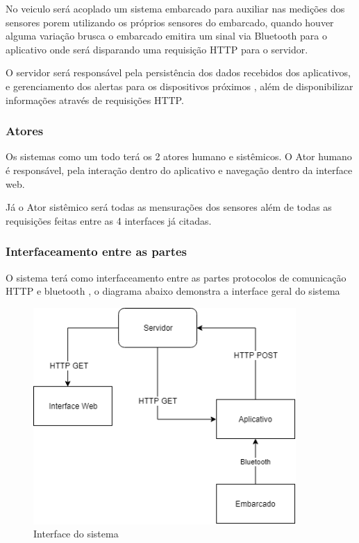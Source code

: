 No veiculo será acoplado um sistema embarcado para auxiliar nas medições dos sensores porem utilizando os próprios sensores do embarcado, quando houver alguma variação brusca o embarcado emitira um sinal via Bluetooth para o aplicativo onde será disparando uma requisição HTTP para o servidor.

O servidor será responsável pela persistência dos dados recebidos dos aplicativos, e gerenciamento dos alertas para os dispositivos próximos , além de disponibilizar informações através de requisições HTTP.

\subsubsection{Atores}

Os sistemas como um todo terá os 2 atores humano e sistêmicos.
O Ator humano é responsável, pela interação dentro do aplicativo e navegação dentro da interface web.

Já o Ator sistêmico será  todas as mensurações dos sensores além de todas as requisições feitas entre as  4 interfaces já citadas.



\clearpage
\subsubsection{Interfaceamento entre as partes}

O sistema terá como interfaceamento entre as partes  protocolos de comunicação HTTP e bluetooth , o diagrama abaixo demonstra a interface geral do sistema



\begin{figure}[H]

 \caption{Interface do sistema}
 \centering
  \includegraphics[width=100mm]{images/Cap3/diagrama_funcionamento.png}
  
    
\end{figure}




